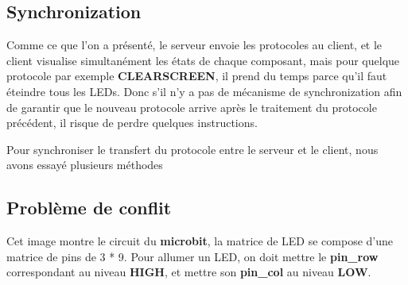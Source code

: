 \documentclass[14px]{article}
\begin{document}
\subsection{Synchronization}
Comme ce que l'on a présenté, le serveur envoie les protocoles au client, et le client visualise simultanément les états de chaque composant, mais pour quelque protocole par exemple \textbf{CLEARSCREEN}, il prend du temps parce qu'il faut éteindre tous les LEDs. Donc s'il n'y a pas de mécanisme de synchronization afin de garantir que le nouveau protocole arrive après le traitement du protocole précédent, il risque de perdre quelques instructions.

Pour synchroniser le transfert du protocole entre le serveur et le client, nous avons essayé plusieurs méthodes


\clearpage

\subsection{Problème de conflit}
\begin{figure}[htbp]
\end{figure}
Cet image montre le circuit du \textbf{microbit}, la matrice de LED se compose d'une matrice de pins de 3 * 9. Pour allumer un LED, on doit mettre le \textbf{pin\_row} correspondant au niveau \textbf{HIGH}, et mettre son \textbf{pin\_col} au niveau \textbf{LOW}.
\end{document}

